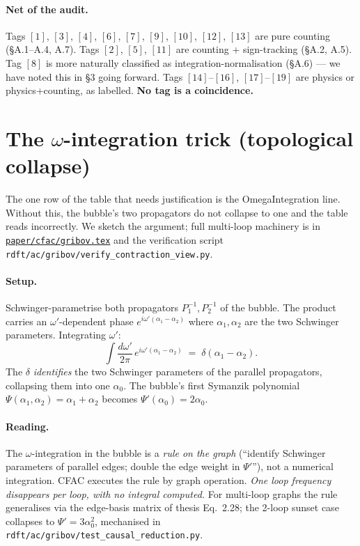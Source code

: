 \documentclass[11pt,a4paper]{article}
\newcommand{\ck}[1]{\textcolor{cntcol}{$[#1]$}}
\newcommand{\pk}[1]{\textcolor{phycol}{$[#1]$}}
\newcommand{\mk}[1]{\textcolor{mixcol}{$[#1]$}}
\begin{document}
\paragraph{Net of the audit.} Tags \ck{1}, \ck{3}, \ck{4}, \ck{6}, \ck{7}, \ck{9},
\ck{10}, \ck{12}, \ck{13} are pure counting (\S A.1--A.4, A.7).
Tags \ck{2}, \ck{5}, \ck{11} are counting + sign-tracking (\S A.2, A.5).
Tag \ck{8} is more naturally classified as integration-normalisation (\S A.6) --- we
have noted this in §3 going forward.
Tags \mk{14}--\mk{16}, \pk{17}--\pk{19} are physics or physics+counting, as labelled.
\textbf{No tag is a coincidence.}

\section{The $\omega$-integration trick (topological collapse)}

\label{app:omega}

The one row of the table that needs justification is the OmegaIntegration line. Without
this, the bubble's two propagators do not collapse to one and the table reads
incorrectly. We sketch the argument; full multi-loop machinery is in
\href{../../paper/cfac/gribov.tex}{\texttt{paper/cfac/gribov.tex}} and the verification
script \texttt{rdft/ac/gribov/verify\_contraction\_view.py}.

\paragraph{Setup.} Schwinger-parametrise both propagators $P_{1}^{-1}, P_{2}^{-1}$ of the
bubble. The product carries an $\omega'$-dependent phase
$e^{i\omega'(\alpha_{1}-\alpha_{2})}$ where $\alpha_{1}, \alpha_{2}$ are the two
Schwinger parameters. Integrating $\omega'$:
\[
\int\!\frac{d\omega'}{2\pi}\,e^{i\omega'(\alpha_{1}-\alpha_{2})}
\;=\; \delta(\alpha_{1}-\alpha_{2}).
\]
The $\delta$ \emph{identifies} the two Schwinger parameters of the parallel propagators,
collapsing them into one $\alpha_{0}$. The bubble's first Symanzik polynomial
$\Psi(\alpha_{1},\alpha_{2}) = \alpha_{1} + \alpha_{2}$ becomes
$\Psi'(\alpha_{0}) = 2\alpha_{0}$.

\paragraph{Reading.} The $\omega$-integration in the bubble is a \emph{rule on the graph}
(``identify Schwinger parameters of parallel edges; double the edge weight in $\Psi'$''),
not a numerical integration. CFAC executes the rule by graph operation. \emph{One loop
frequency disappears per loop, with no integral computed.} For multi-loop graphs the rule
generalises via the edge-basis matrix of thesis Eq.~2.28; the 2-loop sunset case
collapses to $\Psi' = 3\alpha_{0}^{2}$, mechanised in
\texttt{rdft/ac/gribov/test\_causal\_reduction.py}.
\end{document}
